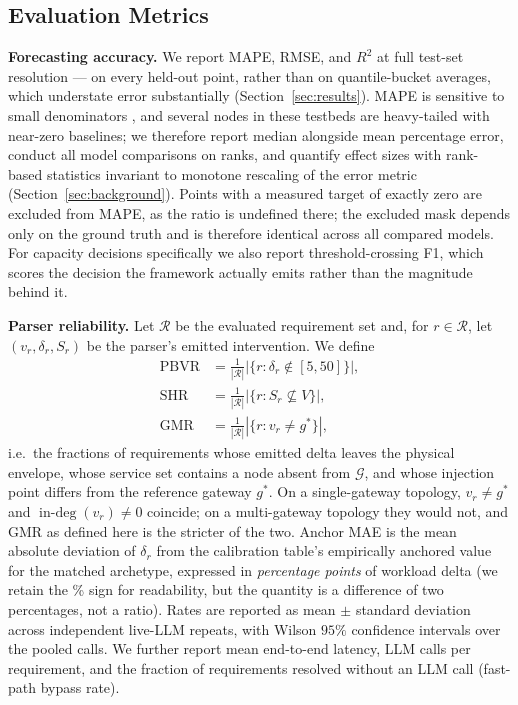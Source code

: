 \documentclass[journal, 10pt]{IEEEtran}
\begin{document}
\subsection{Evaluation Metrics}
\textbf{Forecasting accuracy.} We report MAPE, RMSE, and $R^2$ at full test-set resolution --- on every held-out point, rather than on quantile-bucket averages, which understate error substantially (Section~\ref{sec:results}). MAPE is sensitive to small denominators \cite{hyndman2006accuracy}, and several nodes in these testbeds are heavy-tailed with near-zero baselines; we therefore report median alongside mean percentage error, conduct all model comparisons on ranks, and quantify effect sizes with rank-based statistics invariant to monotone rescaling of the error metric (Section~\ref{sec:background}). Points with a measured target of exactly zero are excluded from MAPE, as the ratio is undefined there; the excluded mask depends only on the ground truth and is therefore identical across all compared models. For capacity decisions specifically we also report threshold-crossing F1, which scores the decision the framework actually emits rather than the magnitude behind it.

\textbf{Parser reliability.} Let $\mathcal{R}$ be the evaluated requirement set and, for $r\in\mathcal{R}$, let $(v_r,\delta_r,S_r)$ be the parser's emitted intervention. We define
\begin{align*}
\text{PBVR} &= \tfrac{1}{|\mathcal{R}|}\left|\{r : \delta_r \notin [5,50]\}\right|,\\
\text{SHR} &= \tfrac{1}{|\mathcal{R}|}\left|\{r : S_r \not\subseteq V\}\right|,\\
\text{GMR} &= \tfrac{1}{|\mathcal{R}|}\left|\{r : v_r \neq g^{*}\}\right|,
\end{align*}
i.e.\ the fractions of requirements whose emitted delta leaves the physical envelope, whose service set contains a node absent from $\mathcal{G}$, and whose injection point differs from the reference gateway $g^{*}$. On a single-gateway topology, $v_r \neq g^{*}$ and $\operatorname{in-deg}(v_r)\neq 0$ coincide; on a multi-gateway topology they would not, and GMR as defined here is the stricter of the two. Anchor MAE is the mean absolute deviation of $\delta_r$ from the calibration table's empirically anchored value for the matched archetype, expressed in \emph{percentage points} of workload delta (we retain the \% sign for readability, but the quantity is a difference of two percentages, not a ratio). Rates are reported as mean $\pm$ standard deviation across independent live-LLM repeats, with Wilson $95\%$ confidence intervals over the pooled calls. We further report mean end-to-end latency, LLM calls per requirement, and the fraction of requirements resolved without an LLM call (fast-path bypass rate).
\end{document}
